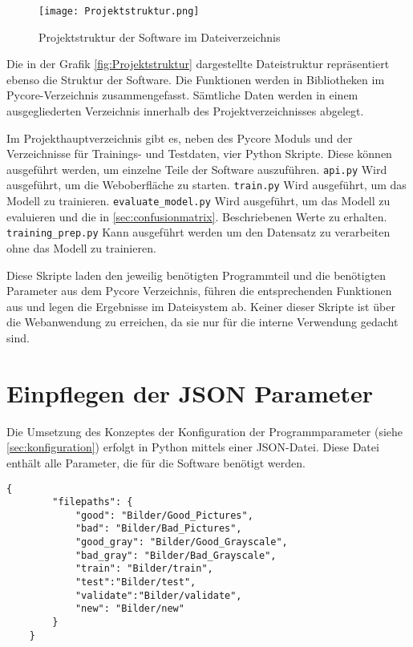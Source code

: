 \begin{figure}[H]
    \centering
    \texttt{[image: Projektstruktur.png]}
    \caption{Projektstruktur der Software im Dateiverzeichnis}
    \label{fig:Projektstruktur}
\end{figure}

Die in der Grafik \autoref{fig:Projektstruktur} dargestellte Dateistruktur repräsentiert ebenso die Struktur der Software. Die Funktionen werden in Bibliotheken im Pycore-Verzeichnis zusammengefasst. 
Sämtliche Daten werden in einem ausgegliederten Verzeichnis innerhalb des Projektverzeichnisses abgelegt. 

Im Projekthauptverzeichnis gibt es, neben des Pycore Moduls und der Verzeichnisse für Trainings- und Testdaten, vier Python Skripte. Diese können ausgeführt werden, um einzelne Teile der Software auszuführen.
\texttt{api.py} Wird ausgeführt, um die Weboberfläche zu starten.
\texttt{train.py} Wird ausgeführt, um das Modell zu trainieren.
\texttt{evaluate\_model.py} Wird ausgeführt, um das Modell zu evaluieren und die in \autoref{sec:confusionmatrix}. Beschriebenen Werte zu erhalten. 
\texttt{training\_prep.py} Kann ausgeführt werden um den Datensatz zu verarbeiten ohne das Modell zu trainieren.

Diese Skripte laden den jeweilig benötigten Programmteil und die benötigten Parameter aus dem Pycore Verzeichnis, führen die entsprechenden Funktionen aus und legen die Ergebnisse im Dateisystem ab.
Keiner dieser Skripte ist über die Webanwendung zu erreichen, da sie nur für die interne Verwendung gedacht sind.

\section{Einpflegen der JSON Parameter} \label{subsec:json_parameter}

Die Umsetzung des Konzeptes der Konfiguration der Programmparameter (siehe \autoref{sec:konfiguration}) erfolgt in Python mittels einer \ac{JSON}-Datei.
Diese Datei enthält alle Parameter, die für die Software benötigt werden.

\begin{lstlisting}[style=json, label=lst:json_example, caption={Beispiel einer \ac{JSON}-Datei mit Parametern des mobilnet Modells}]
    {
        "filepaths": {
            "good": "Bilder/Good_Pictures",
            "bad": "Bilder/Bad_Pictures",
            "good_gray": "Bilder/Good_Grayscale",
            "bad_gray": "Bilder/Bad_Grayscale",
            "train": "Bilder/train",
            "test":"Bilder/test",
            "validate":"Bilder/validate",
            "new": "Bilder/new"
        }
    }
\end{lstlisting}

